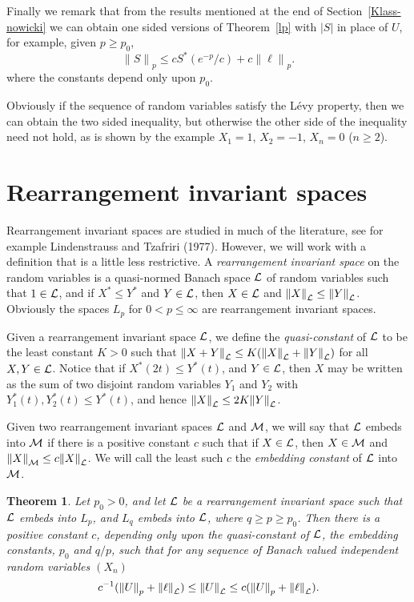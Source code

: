 \documentclass[12pt]{article}
\newtheorem{thm}{Theorem}[section]
\newcommand{\cL}{{\cal L}}
\newcommand{\cM}{{\cal M}}
\newcommand{\modo}[1]{{\left|#1\right|}}
\newcommand{\normo}[1]{{\left\|#1\right\|}}
\newcommand{\snormo}[1]{{\mathopen\|#1\mathclose\|}}
\begin{document}
Finally we remark that from the results mentioned at the end of 
Section~\ref{Klass-nowicki} we can obtain one sided versions of 
Theorem~\ref{lp} with $\modo{S}$ in place of $U$, for
example, given $p \ge p_0$,
$$ \snormo S_p \le c S^*(e^{-p}/c) + c \snormo \ell_p .$$
where the constants depend only upon $p_0$.

Obviously if the sequence of random variables satisfy the L\'evy property,
then we can obtain the two sided inequality, but otherwise the other
side of the inequality need not hold, as is shown by the example
$X_1 = 1$, $X_2 = -1$, $X_n = 0$ ($n \ge 2$).

\section{Rearrangement invariant spaces}
\label{Ri}

Rearrangement invariant spaces are studied in much 
of the
literature, see for example Lindenstrauss and Tzafriri (1977).
However, we will work with a definition that is a little
less restrictive.
A {\em rearrangement invariant space\/} on the
random variables is a quasi-normed Banach space $\cL$ of
random variables such that $1 \in \cL$, and if $X^* \le Y^*$ and $Y
\in \cL$, then $X \in \cL$ and $\normo X_\cL \le \normo Y_\cL$.
Obviously the spaces $L_p$ for $0<p\le \infty$ are rearrangement
invariant spaces.

Given a rearrangement invariant space $\cL$, we
define the {\em quasi-constant\/} of $\cL$ to be the least constant $K>0$ such
that $\normo{X+Y}_\cL \le K(\normo X_\cL + \normo Y_\cL)$ for
 all $X,Y \in \cL$.  Notice that
 if $X^*(2t) \le Y^*(t)$, and $Y \in \cL$, 
then $X$ may be written as the sum of two disjoint 
random variables $Y_1$ and $Y_2$ with $Y_1^*(t),Y_2^*(t) \le Y^*(t)$,
and hence $\normo X_\cL \le 2K \normo Y_\cL$.

Given two rearrangement invariant spaces $\cL$ and $\cM$, we will say
that $\cL$ embeds into $\cM$ if there is a positive constant $c$ such that if
$X \in \cL$, then $X \in \cM$ and $\normo X_\cM \le c \normo X_\cL$.
We will call the least such $c$ the {\em embedding constant\/} of
$\cL$ 
into $\cM$.

\begin{thm}
Let $p_0>0$, and let $\cL$ be a rearrangement invariant
space such that $\cL$ embeds into $L_p$, and $L_q$ embeds into $\cL$, 
where $q \ge p \ge p_0$. Then there is a positive constant $c$, depending 
only upon the quasi-constant of $\cL$, the embedding constants, $p_0$
and 
$q/p$, such that 
for any sequence of Banach valued independent random variables $(X_n)$
$$ c^{-1}(\normo U_p + \normo\ell_\cL) \le \normo
U_\cL  \le 
c(\normo U_p + \normo\ell_\cL) .$$
\end{thm}
\end{document}
